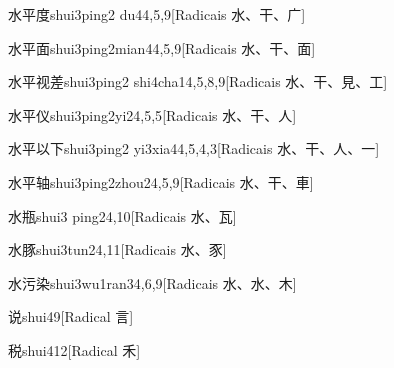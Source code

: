 \begin{entry}{水平度}{shui3ping2 du4}{4,5,9}[Radicais ⽔、⼲、⼴]
\end{entry}

\begin{entry}{水平面}{shui3ping2mian4}{4,5,9}[Radicais ⽔、⼲、⾯]
\end{entry}

\begin{entry}{水平视差}{shui3ping2 shi4cha1}{4,5,8,9}[Radicais ⽔、⼲、⾒、⼯]
\end{entry}

\begin{entry}{水平仪}{shui3ping2yi2}{4,5,5}[Radicais ⽔、⼲、⼈]
\end{entry}

\begin{entry}{水平以下}{shui3ping2 yi3xia4}{4,5,4,3}[Radicais ⽔、⼲、⼈、⼀]
\end{entry}

\begin{entry}{水平轴}{shui3ping2zhou2}{4,5,9}[Radicais ⽔、⼲、⾞]
\end{entry}

\begin{entry}{水瓶}{shui3 ping2}{4,10}[Radicais ⽔、⽡]
\end{entry}

\begin{entry}{水豚}{shui3tun2}{4,11}[Radicais ⽔、⾗]
\end{entry}

\begin{entry}{水污染}{shui3wu1ran3}{4,6,9}[Radicais ⽔、⽔、⽊]
\end{entry}

\begin{entry}{说}{shui4}{9}[Radical ⾔]
\end{entry}

\begin{entry}{税}{shui4}{12}[Radical ⽲]
\end{entry}

